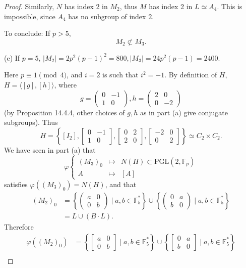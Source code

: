 \documentclass[11pt,a4paper]{article}
\newcommand{\F}{\mathbb{F}}
\begin{document}
{\begin{proof}
Similarly, $N$ has index 2 in $M_2$, thus $M$ has index 2 in $L \simeq A_4$. This is impossible, since $A_4$ has no subgroup of index $2$.

To conclude: If $p>5$,
$$M_2 \not \subset M_3.$$

\item[(e)] If $p=5$, $|M_2| = 2p^2(p-1)^2 = 800, |M_3| = 24p^2(p-1) = 2400$. 

Here $p \equiv 1 \pmod 4$, and $i=2$ is such that $i^2 = -1$. By definition of $H$, $H =\langle [g],[h] \rangle$, where
$$ g = \begin{pmatrix} 0 & -1 \\ 1 & 0 \end{pmatrix}, h =  \begin{pmatrix} 2 & 0  \\0 & -2 \end{pmatrix}$$
(by Proposition 14.4.4, other choices of $g,h$ as in part (a) give conjugate subgroups). Thus
$$H = \left \{ [I_2],  \begin{bmatrix} 0 & -1 \\ 1 & 0 \end{bmatrix},  \begin{bmatrix} 0 & 2  \\2 & 0 \end{bmatrix}, \begin{bmatrix} -2 & 0 \\ 0 & 2 \end{bmatrix}\right\} \simeq C_2\times C_2.$$
We have seen in part (a) that
$$
\varphi
\left\{
\begin{array}{ccl}
(M_3)_0 & \mapsto & N(H) \subset \mathrm{PGL}(2,\F_p)\\
A & \mapsto &[A]
\end{array}
\right.
$$
satisfies $\varphi((M_3)_0) = N(H)$, and that
\begin{align*}
(M_2)_0 &= \left \{  \begin{pmatrix} a & 0 \\ 0 & b \end{pmatrix} \mid a,b \in \F_5^* \right\} \cup \left \{  \begin{pmatrix} 0 & a \\ b & 0 \end{pmatrix} \mid a,b \in \F_5^* \right\} \\
&= L \cup (B\cdot L).
\end{align*}
Therefore
\begin{align*}
\varphi((M_2)_0 )&= \left \{  \begin{bmatrix} a & 0 \\ 0 & b \end{bmatrix} \mid a,b \in \F_5^* \right\} \cup \left \{  \begin{bmatrix} 0 & a \\ b & 0 \end{bmatrix} \mid a,b \in \F_5^* \right\} \\

\end{align*}
\end{proof}}
\end{document}
